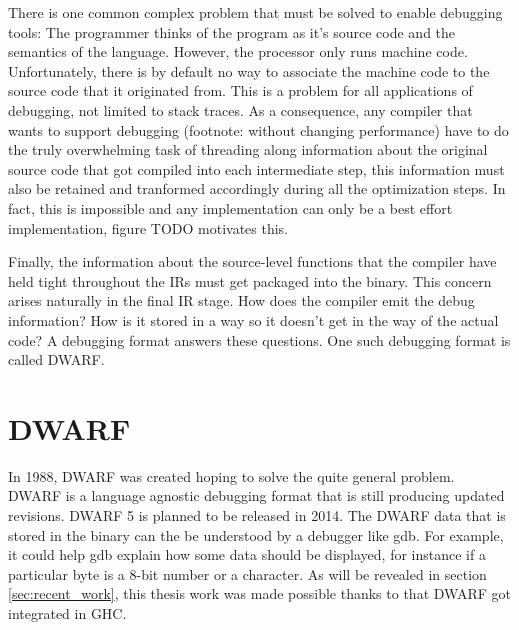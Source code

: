 There is one common complex problem that must be solved to enable debugging
tools: The programmer thinks of the program as it's source code and the
semantics of the language. However, the processor only runs machine code.
Unfortunately, there is by default no way to associate the machine code to the
source code that it originated from. This is a problem for all applications of
debugging, not limited to stack traces. \cite{eager2012introduction} As a consequence, any
compiler that wants to support debugging (footnote: without changing
performance) have to do the truly overwhelming task of threading along
information about the original source code that got compiled into each
intermediate step, this information must also be retained and tranformed
accordingly during all the optimization steps. In fact, this is impossible and
any implementation can only be a best effort implementation, figure TODO
motivates this.

Finally, the information  about the source-level functions that the compiler
have held tight throughout the IRs must get packaged into the binary. This
concern arises naturally in the final IR stage.  How does the compiler emit the
debug information? How is it stored in a way so it doesn't get in the way of the
actual code?  A debugging format answers these questions. One such debugging
format is called DWARF.

\section{DWARF}

In 1988, DWARF was created hoping to solve the quite general problem. DWARF is
a language agnostic debugging format that is still producing updated revisions.
DWARF 5 is planned to be released in 2014. \cite{eager2012introduction} The DWARF data that is
stored in the binary can the be understood by a debugger like gdb. For example,
it could help gdb explain how some data should be displayed, for instance if a
particular byte is a 8-bit number or a character. As will be revealed in
section \ref{sec:recent_work}, this thesis work was made possible thanks
to that DWARF got integrated in GHC.
